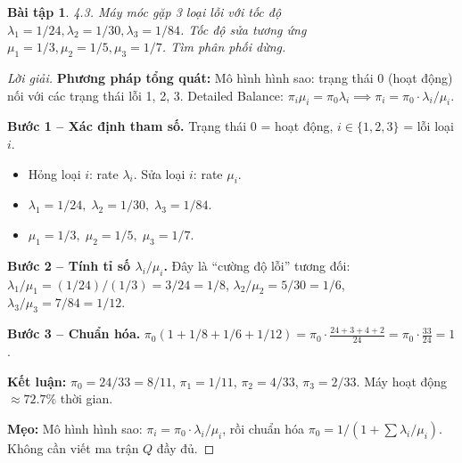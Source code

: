 \documentclass[8pt,a4paper]{article}
\newtheorem{exercise}{Bài tập}
\newenvironment{solution}{\begin{proof}[Lời giải]}{\end{proof}}
\begin{document}
\begin{exercise}
4.3. Máy móc gặp 3 loại lỗi với tốc độ $\lambda_1 = 1/24, \lambda_2 = 1/30, \lambda_3 = 1/84$. Tốc độ sửa tương ứng $\mu_1 = 1/3, \mu_2 = 1/5, \mu_3 = 1/7$. Tìm phân phối dừng.
\end{exercise}
\begin{solution}
\textbf{Phương pháp tổng quát:} Mô hình hình sao: trạng thái 0 (hoạt động) nối với các trạng thái lỗi 1, 2, 3. Detailed Balance: $\pi_i \mu_i = \pi_0 \lambda_i \implies \pi_i = \pi_0 \cdot \lambda_i/\mu_i$.

\textbf{Bước 1 -- Xác định tham số.} Trạng thái 0 = hoạt động, $i \in \{1,2,3\}$ = lỗi loại $i$.
\begin{itemize}[nosep]
\item Hỏng loại $i$: rate $\lambda_i$. Sửa loại $i$: rate $\mu_i$.
\item $\lambda_1 = 1/24,\; \lambda_2 = 1/30,\; \lambda_3 = 1/84$.
\item $\mu_1 = 1/3,\; \mu_2 = 1/5,\; \mu_3 = 1/7$.
\end{itemize}

\textbf{Bước 2 -- Tính tỉ số $\lambda_i/\mu_i$.} Đây là ``cường độ lỗi'' tương đối:
$\lambda_1/\mu_1 = (1/24)/(1/3) = 3/24 = 1/8$, \quad $\lambda_2/\mu_2 = 5/30 = 1/6$, \quad $\lambda_3/\mu_3 = 7/84 = 1/12$.

\textbf{Bước 3 -- Chuẩn hóa.} $\pi_0(1 + 1/8 + 1/6 + 1/12) = \pi_0 \cdot \frac{24 + 3 + 4 + 2}{24} = \pi_0 \cdot \frac{33}{24} = 1$.

\textbf{Kết luận:} $\pi_0 = 24/33 = \boxed{8/11}$, $\pi_1 = 1/11$, $\pi_2 = 4/33$, $\pi_3 = 2/33$. Máy hoạt động $\approx 72.7\%$ thời gian.

\textbf{Mẹo:} Mô hình hình sao: $\pi_i = \pi_0 \cdot \lambda_i/\mu_i$, rồi chuẩn hóa $\pi_0 = 1/(1 + \sum \lambda_i/\mu_i)$. Không cần viết ma trận $Q$ đầy đủ.
\end{solution}
\end{document}
